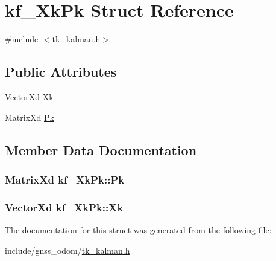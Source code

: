 \hypertarget{structkf___xk_pk}{\section{kf\-\_\-\-Xk\-Pk Struct Reference}
\label{structkf___xk_pk}
}


{\ttfamily \#include $<$tk\-\_\-kalman.\-h$>$}

\subsection*{Public Attributes}
\begin{DoxyCompactItemize}
\item 
Vector\-Xd \hyperlink{structkf___xk_pk_a0ee00a132a76beb9c8a034f772c01bad}{Xk}
\item 
Matrix\-Xd \hyperlink{structkf___xk_pk_a8d6b114763c42317bc4acbb3eb236ce6}{Pk}
\end{DoxyCompactItemize}


\subsection{Member Data Documentation}
\hypertarget{structkf___xk_pk_a8d6b114763c42317bc4acbb3eb236ce6}{
\subsubsection[{Pk}]{\setlength{\rightskip}{0pt plus 5cm}Matrix\-Xd kf\-\_\-\-Xk\-Pk\-::\-Pk}}\label{structkf___xk_pk_a8d6b114763c42317bc4acbb3eb236ce6}
\hypertarget{structkf___xk_pk_a0ee00a132a76beb9c8a034f772c01bad}{
\subsubsection[{Xk}]{\setlength{\rightskip}{0pt plus 5cm}Vector\-Xd kf\-\_\-\-Xk\-Pk\-::\-Xk}}\label{structkf___xk_pk_a0ee00a132a76beb9c8a034f772c01bad}


The documentation for this struct was generated from the following file\-:\begin{DoxyCompactItemize}
\item 
include/gnss\-\_\-odom/\hyperlink{tk__kalman_8h}{tk\-\_\-kalman.\-h}\end{DoxyCompactItemize}
